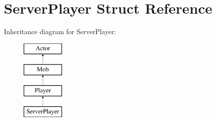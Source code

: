 \hypertarget{struct_server_player}{}\section{Server\+Player Struct Reference}
\label{struct_server_player}
Inheritance diagram for Server\+Player\+:\begin{figure}[H]
\begin{center}
\leavevmode
\includegraphics[height=4.000000cm]{struct_server_player}
\end{center}
\end{figure}
